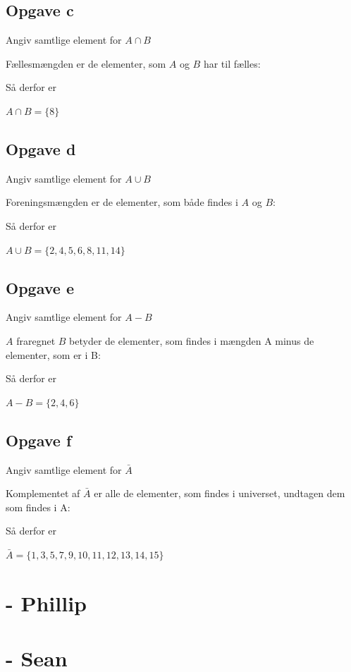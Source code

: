 \documentclass{article}
\begin{document}
\subsection*{Opgave c}
Angiv samtlige element for $A \cap B$

Fællesmængden er de elementer, som $A$ og $B$ har til fælles:

Så derfor er

\begin{center}
$A \cap B = \{ 8 \}$  
\end{center}

\subsection*{Opgave d}
Angiv samtlige element for $A \cup B$

Foreningsmængden er de elementer, som både findes i $A$ og $B$:

Så derfor er

\begin{center}
$A \cup B = \{ 2, 4, 5, 6, 8, 11, 14 \}$  
\end{center}

\subsection*{Opgave e}
Angiv samtlige element for $A - B$

$A$ fraregnet $B$ betyder de elementer, som findes i mængden A minus de elementer, som er i B:

Så derfor er

\begin{center}
$A - B = \{ 2, 4, 6 \}$  
\end{center}

\subsection*{Opgave f}
Angiv samtlige element for $\bar{A}$

Komplementet af $\bar{A}$ er alle de elementer, som findes i universet, undtagen dem som findes i A:

Så derfor er

\begin{center}
$\bar{A} = \{ 1, 3, 5, 7, 9, 10, 11, 12, 13, 14, 15 \}$  
\end{center}

\section{- Phillip}

\section{- Sean}
\end{document}
